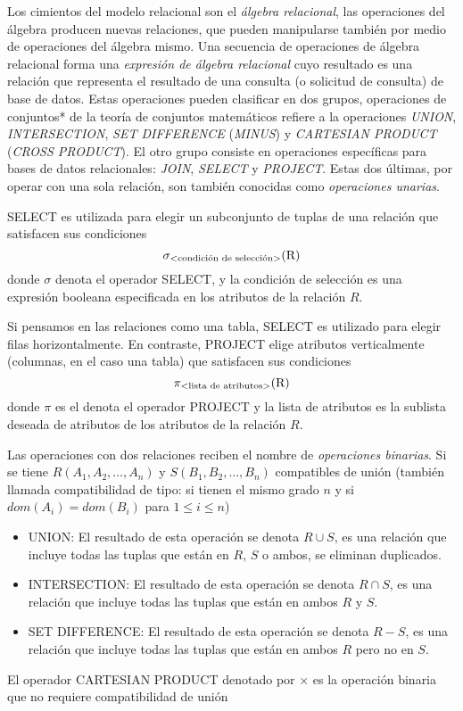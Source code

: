 Los cimientos del modelo relacional son el \emph{álgebra relacional}, las operaciones del álgebra producen nuevas relaciones, que pueden manipularse también por medio de operaciones del álgebra mismo. Una secuencia de operaciones de álgebra relacional forma una \emph{expresión de álgebra relacional} cuyo resultado es una relación que representa el resultado de una consulta (o solicitud de consulta) de base de datos. Estas operaciones pueden clasificar en dos grupos, operaciones de conjuntos* de la teoría de conjuntos matemáticos refiere a la operaciones \emph{UNION}, \emph{INTERSECTION}, \emph{SET DIFFERENCE} (\emph{MINUS}) y \emph{CARTESIAN PRODUCT} (\emph{CROSS PRODUCT}). El otro grupo consiste en operaciones específicas para bases de datos relacionales: \emph{JOIN}, \emph{SELECT} y \emph{PROJECT}. Estas dos últimas, por operar con una sola relación, son también conocidas como \emph{operaciones unarias}.

SELECT es utilizada para elegir un subconjunto de tuplas de una relación que satisfacen sus condiciones
\begin{equation}
\sigma_\text{\textless condición de selección\textgreater}{\text{(R)}}
\end{equation}
donde $\sigma$ denota el operador SELECT, y la condición de selección es una expresión booleana especificada en los atributos de la relación $R$.

Si pensamos en las relaciones como una tabla, SELECT es utilizado para elegir filas horizontalmente. En contraste, PROJECT elige atributos verticalmente (columnas, en el caso una tabla) que satisfacen sus condiciones
\begin{equation}
\pi_\text{\textless lista de atributos\textgreater}{\text{(R)}}
\end{equation}
donde $\pi$ es el denota el operador PROJECT y la lista de atributos es la sublista deseada de atributos de los atributos de la relación $R$.

Las operaciones con dos relaciones reciben el nombre de \emph{operaciones binarias}. Si se tiene $R(A_1,A_2,\ldots,A_n)$ y $S(B_1,B_2,\ldots,B_n)$ compatibles de unión (también llamada compatibilidad de tipo: si tienen el mismo grado $n$ y si $dom(A_i)=dom(B_i)$ para $1\leq i\leq n$)
\begin{itemize}
\item UNION: El resultado de esta operación se denota $R \cup S$, es una relación que incluye todas las tuplas que están en $R$, $S$ o ambos, se eliminan duplicados.
\item INTERSECTION: El resultado de esta operación se denota $R \cap S$, es una relación que incluye todas las tuplas que están en ambos $R$ y $S$.
\item SET DIFFERENCE: El resultado de esta operación se denota $R - S$, es una relación que incluye todas las tuplas que están en ambos $R$ pero no en $S$.
\end{itemize}
El operador CARTESIAN PRODUCT denotado por $\times$ es la operación binaria que no requiere compatibilidad de unión